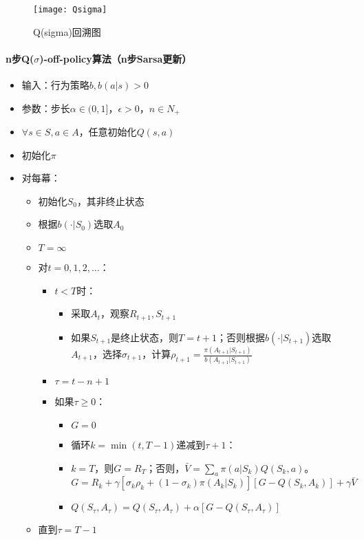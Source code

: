 \documentclass[
12pt, %
a4paper, 
oneside, %
headinclude,footinclude, %
]{scrartcl}
\begin{document}
\begin{figure}[H]
\centering
\texttt{[image: Qsigma]}
\caption[Q(sigma)回溯图]{Q(sigma)回溯图}
\end{figure}
\paragraph{n步Q($ \sigma $)-off-policy算法（n步Sarsa更新）}
\begin{itemize}
\item 输入：行为策略$ b, b(a|s) > 0 $
\item 参数：步长$ \alpha \in (0,1] $，$ \epsilon > 0 $，$ n \in N_+ $
\item $ \forall s \in S, a \in A $，任意初始化$ Q(s, a) $
\item 初始化$ \pi $
\item 对每幕：
\begin{itemize}
\item 初始化$ S_0 $，其非终止状态
\item 根据$ b(\cdot|S_0) $选取$ A_0 $
\item $ T = \infty $
\item 对$ t = 0, 1, 2, \dots $：
\begin{itemize}
\item $ t < T $时：
\begin{itemize}
\item 采取$ A_t $，观察$ R_{t + 1}, S_{t + 1} $
\item 如果$ S_{t + 1} $是终止状态，则$ T = t + 1 $；否则根据$ b(\cdot|S_{t + 1}) $选取$ A_{t + 1} $，选择$ \sigma_{t + 1} $，计算$ \rho_{t + 1} = \frac{\pi(A_{t + 1}|S_{t + 1})}{b(A_{t + 1}|S_{t + 1})} $
\end{itemize}
\item $ \tau = t - n + 1 $
\item 如果$ \tau \geq 0 $：
\begin{itemize}
\item $ G = 0 $
\item 循环$ k = \min(t, T - 1) $递减到$ \tau + 1 $：
\item $ k = T $，则$ G = R_T $；否则，$ \bar{V} = \sum_a \pi(a|S_k)Q(S_k,a) $。$ G = R_k + \gamma[\sigma_k \rho_k + (1 - \sigma_k)\pi(A_k|S_k)][G - Q(S_k,A_k)] + \gamma\bar{V} $
\item $ Q(S_{\tau},A_{\tau}) = Q(S_{\tau},A_{\tau}) + \alpha[G - Q(S_{\tau},A_{\tau})] $
\end{itemize}
\end{itemize}
\item 直到$ \tau = T - 1 $
\end{itemize}
\end{itemize}
\end{document}
